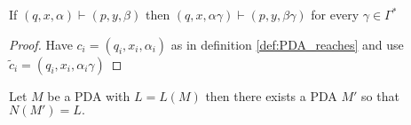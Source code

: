 \begin{theorem}\label{thm:PDA_reaches_unconsumed_stack}
  If $(q,x,\alpha)\vdash(p,y,\beta)$ then $(q,x,\alpha\gamma)\vdash(p,y,\beta\gamma)$ for
  every $\gamma\in\Gamma^*$
\end{theorem}
\begin{proof}
  Have $c_i = (q_i,x_i,\alpha_i)$ as in definition \ref{def:PDA_reaches} and use
  $\tilde{c}_i = (q_i,x_i,\alpha_i\gamma)$
\end{proof}
\begin{theorem}\label{thm:PDA_empty_stack_of_final_state}
  Let $M$ be a PDA with $L=L(M)$ then there exists a PDA $M'$ so that $N(M')=L.$
\end{theorem}
